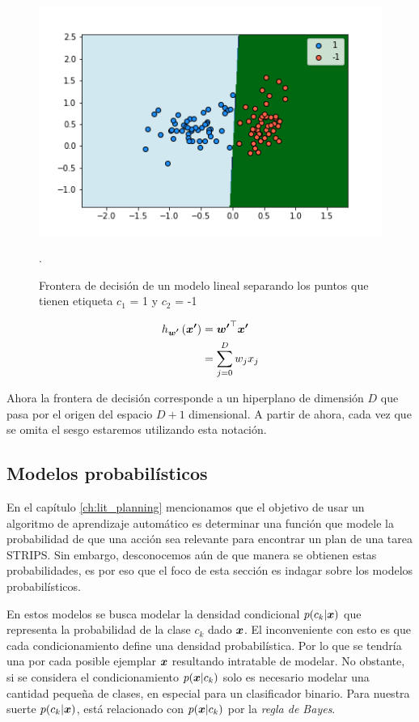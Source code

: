\begin{figure}
    \centering
    \includegraphics[scale=0.5]{figures/decision_boundary.png}
    \caption{Frontera de decisión de un modelo lineal separando los puntos que
    tienen etiqueta $c_1$ = 1 y $c_2$ = -1}.
    \label{fig:linear_model_boundary}
\end{figure}

\begin{align}
    h_{\boldsymbol{w'}}\left( \boldsymbol{x'} \right) &= \boldsymbol{w'}^{\top} \boldsymbol{x'}\\
                                           &= \sum_{j = 0 }^{D} w_j x_j
\end{align}

Ahora la frontera de decisión corresponde a un hiperplano de dimensión $D$ que
pasa por el origen del espacio $D + 1$ dimensional. A partir de ahora, cada vez
que se omita el sesgo estaremos utilizando esta notación.

\subsection{Modelos probabilísticos}
\label{subch:prob_models}

En el capítulo \ref{ch:lit_planning} mencionamos que el objetivo de usar un
algoritmo de aprendizaje automático es determinar una función que modele la
probabilidad de que una acción sea relevante para encontrar un plan de una tarea
STRIPS. Sin embargo, desconocemos aún de que manera se obtienen estas
probabilidades, es por eso que el foco de esta sección es indagar sobre los
modelos probabilísticos.

En estos modelos se busca modelar la densidad condicional $p(c_k | \boldsymbol{x})$
que representa la probabilidad de la clase $c_k$ dado $\boldsymbol{x}$. El
inconveniente con esto es que cada condicionamiento define una densidad
probabilística. Por lo que se tendría una por cada posible ejemplar $\boldsymbol{x}$
resultando intratable de modelar. No obstante, si se considera el
condicionamiento $p(\boldsymbol{x} | c_k)$ solo es necesario modelar una cantidad
pequeña de clases, en especial para un clasificador binario. Para nuestra suerte
$p(c_k | \boldsymbol{x})$, está relacionado con $p(\boldsymbol{x} | c_k)$ por la \emph{regla
de Bayes}.

